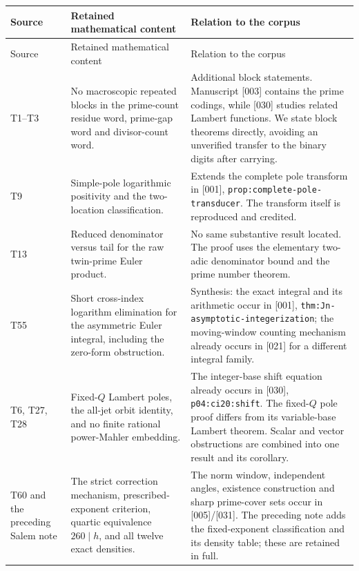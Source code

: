 \documentclass[11pt,a4paper]{article}
\theoremstyle{definition}\newtheorem{definition}[theorem]{Definition}
\theoremstyle{remark}\newtheorem{remark}[theorem]{Remark}
\begin{document}
\small
\begin{longtable}{@{}>{\raggedright\arraybackslash}p{}>{\raggedright\arraybackslash}p{}>{\raggedright\arraybackslash}p{}@{}}
\toprule
Source & Retained mathematical content & Relation to the corpus\\
\midrule
\endfirsthead
\toprule Source & Retained mathematical content & Relation to the corpus\\
\midrule
\endhead
T1--T3 &
No macroscopic repeated blocks in the prime-count residue word,
prime-gap word and divisor-count word. &
Additional block statements. Manuscript [003] contains the prime
codings, while [030] studies related Lambert functions. We state
block theorems directly, avoiding an unverified transfer to the
binary digits after carrying.\\[5pt]
T9 &
Simple-pole logarithmic positivity and the two-location
classification. &
Extends the complete pole transform in [001],
\texttt{prop:complete-pole-transducer}. The transform itself is
reproduced and credited.\\[5pt]
T13 &
Reduced denominator versus tail for the raw twin-prime
Euler product. &
No same substantive result located. The proof uses the elementary
two-adic denominator bound and the prime number theorem.\\[5pt]
T55 &
Short cross-index logarithm elimination for the asymmetric
Euler integral, including the zero-form obstruction. &
Synthesis: the exact integral and its arithmetic occur in [001],
\texttt{thm:Jn-asymptotic-integerization}; the moving-window counting
mechanism already occurs in [021] for a different integral family.\\[5pt]
T6, T27, T28 &
Fixed-$Q$ Lambert poles, the all-jet orbit identity, and no finite
rational power-Mahler embedding. &
The integer-base shift equation already occurs in [030],
\texttt{p04:ci20:shift}. The fixed-$Q$ pole proof differs from its
variable-base Lambert theorem. Scalar and vector obstructions are
combined into one result and its corollary.\\[5pt]
T60 and the preceding Salem note &
The strict correction mechanism, prescribed-exponent criterion,
quartic equivalence $260\mid h$, and all twelve exact densities. &
The norm window, independent angles, existence construction and sharp
prime-cover sets occur in [005]/[031]. The preceding note adds the
fixed-exponent classification and its density table; these are
retained in full.\\
\bottomrule
\end{longtable}
\normalsize
\end{document}
